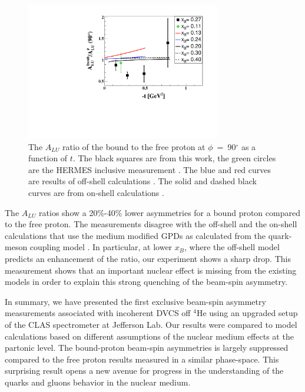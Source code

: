 \documentclass[twocolumn,nofootinbib,showpacs,prl,superscriptaddress,secnumarabic,amssymb,nobibnotes,aps,floatfix]{revtex4}
\begin{document}
\begin{figure}[tb]
\centering
\includegraphics[width=8.5cm]{figs/ALU_ratioInc_t_shortscenrario.pdf}
\caption{ The $A_{LU}$ ratio of the bound to the free proton at 
   $\phi$~=~90$^{\circ}$ as a function of $t$. The black squares are from this 
   work, the green circles are the HERMES inclusive measurement 
   \cite{Airapetian:2009cga}. The blue and red curves are results of off-shell 
   calculations \cite{simonetta_2}. The solid and dashed black curves are from 
   on-shell calculations \cite{Guzey:2008fe}.} 
   \label{fig:incoh_EMC_ratio_ALU_proton}
\end{figure}

The $A_{LU}$ ratios show a 20\%-40\% lower asymmetries for a bound proton compared 
to the free proton. The measurements disagree with the off-shell \cite{simonetta_2} 
and the on-shell calculations that use the medium modified GPDs as calculated from 
the quark-meson coupling model \cite{Guzey:2008fe}. In particular, at lower $x_B$, 
where the off-shell model predicts an enhancement of the ratio, our experiment 
shows a sharp drop. This measurement shows that an important nuclear effect is
missing from the existing models in order to explain this strong quenching of
the beam-spin asymmetry.


In summary, we have presented the first exclusive beam-spin asymmetry measurements 
associated with incoherent DVCS off $^4$He using an upgraded setup of the CLAS 
spectrometer at Jefferson Lab. Our results were compared to model 
calculations based on different assumptions of the nuclear medium effects at 
the partonic level.  The bound-proton 
beam-spin asymmetries is largely suppressed compared to the free proton 
results measured in a similar phase-space. This surprising result opens a new avenue 
for progress in the understanding of the quarks and gluons behavior in the
nuclear medium.
\end{document}
